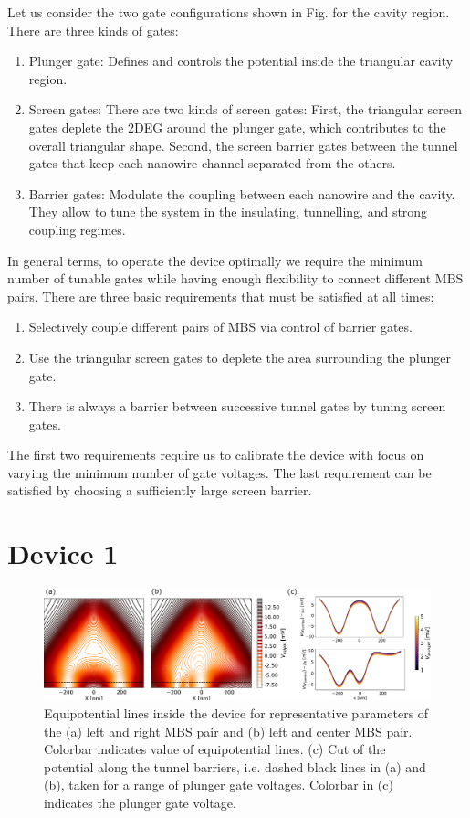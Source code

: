 Let us consider the two gate configurations shown in Fig. for the cavity region.
There are three kinds of gates:
\begin{enumerate}
\item Plunger gate: Defines and controls the potential inside the triangular cavity region.
\item Screen gates: There are two kinds of screen gates: First, the triangular screen gates deplete the 2DEG around the plunger gate, which contributes to the overall triangular shape. Second, the screen barrier gates between the tunnel gates that keep each nanowire channel separated from the others.
\item Barrier gates: Modulate the coupling between each nanowire and the cavity. They allow to tune the system in the insulating, tunnelling, and strong coupling regimes.
\end{enumerate}

In general terms, to operate the device optimally we require the minimum number of tunable gates while having enough flexibility to connect different MBS pairs.
There are three basic requirements that must be satisfied at all times:
\begin{enumerate}
\item Selectively couple different pairs of MBS via control of barrier gates.
\item Use the triangular screen gates to deplete the area surrounding the plunger gate.
\item There is always a barrier between successive tunnel gates by tuning screen gates.
\end{enumerate}
The first two requirements require us to calibrate the device with focus on varying the minimum number of gate voltages.
The last requirement can be satisfied by choosing a sufficiently large screen barrier.

\section{Device 1}

\begin{figure}[h!]
\centering
  \includegraphics[width=\linewidth]{figures/device_1_potential.pdf}
  \caption{Equipotential lines inside the device for representative parameters of the (a) left and right MBS pair and (b) left and center MBS pair. Colorbar indicates value of equipotential lines. (c) Cut of the potential along the tunnel barriers, i.e. dashed black lines in (a) and (b), taken for a range of plunger gate voltages. Colorbar in (c) indicates the plunger gate voltage.}
  \label{fig:device_1_barriers}
\end{figure}

